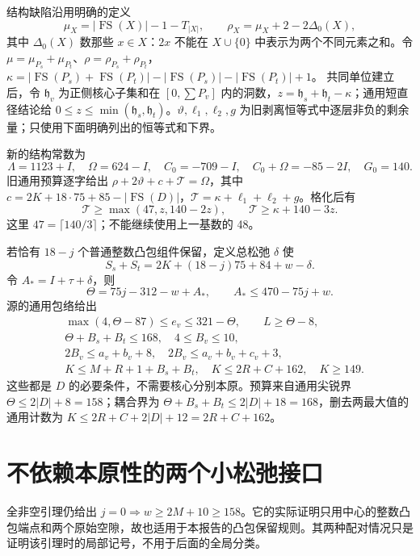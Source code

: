 \documentclass[11pt,a4paper]{article}
\begin{document}
结构缺陷沿用明确的定义 \[
\mu_X=|\operatorname{FS}(X)|-1-T_{|X|},\qquad
\rho_X=\mu_X+2-2\Delta_0(X),
\] 其中 \(\Delta_0(X)\) 数那些 \(x\in X\)：\(2x\) 不能在 \(X\cup\{0\}\)
中表示为两个不同元素之和。令
\(\mu=\mu_{P_s}+\mu_{P_t}\)、\(\rho=\rho_{P_s}+\rho_{P_t}\)，
\(\kappa=|\operatorname{FS}(P_s)+\operatorname{FS}(P_t)|-|\operatorname{FS}(P_s)|-|\operatorname{FS}(P_t)|+1\)。
共同单位建立后，令 \(\mathfrak h_v\) 为正侧核心子集和在 \([0,\sum P_v]\)
内的洞数，\(z=\mathfrak h_s+\mathfrak h_t-\kappa\)；通用短直径结论给
\(0\le z\le\min(\mathfrak h_s,\mathfrak h_t)\)。\(\vartheta,\ell_1,\ell_2,g\)
为旧剥离恒等式中逐层非负的剩余量；只使用下面明确列出的恒等式和下界。

新的结构常数为 \[
 \Lambda=1123+I,\quad \Omega=624-I,\quad C_0=-709-I,
 \quad C_0+\Omega=-85-2I,\quad G_0=140.
\] 旧通用预算逐字给出 \(\rho+2\vartheta+c+\mathcal T=\Omega\)，其中
\(c=2K+18\cdot75+85-|\operatorname{FS}(D)|\)，\(\mathcal T=\kappa+\ell_1+\ell_2+g\)。格化后有
\[
 \mathcal T\ge\max(47,z,140-2z),\qquad
 \mathcal T\ge\kappa+140-3z.
\] 这里 \(47=\lceil140/3\rceil\)；不能继续使用上一基数的 48。

若恰有 \(18-j\) 个普通整数凸包组件保留，定义总松弛 \(\delta\) 使 \[
 S_s+S_t=2K+(18-j)75+84+w-\delta.
\] 令 \(A_*=I+\tau+\delta\)，则 \[
 \Theta=75j-312-w+A_*,\qquad A_*\le470-75j+w.
\] 源的通用包络给出 \[
 \begin{aligned}
 &\max(4,\Theta-87)\le e_v\le321-\Theta,\qquad L\ge\Theta-8,\\
 &\Theta+B_s+B_t\le168,\quad 4\le B_v\le10,\\
 &2B_v\le a_v+b_v+8,\quad 2B_v\le a_v+b_v+c_v+3,\\
 &K\le M+R+1+B_s+B_t,\quad K\le2R+C+162,\quad K\ge149.
 \end{aligned}
\] 这些都是 \(D\) 的必要条件，不需要核心分别本原。预算来自通用尖锐界
\(\Theta\le2|D|+8=158\)；耦合界为
\(\Theta+B_s+B_t\le2|D|+18=168\)，删去两最大值的通用计数为
\(K\le2R+C+2|D|+12=2R+C+162\)。

\hypertarget{ux4e0dux4f9dux8d56ux672cux539fux6027ux7684ux4e24ux4e2aux5c0fux677eux5f1bux63a5ux53e3}{%
\section{不依赖本原性的两个小松弛接口}\label{ux4e0dux4f9dux8d56ux672cux539fux6027ux7684ux4e24ux4e2aux5c0fux677eux5f1bux63a5ux53e3}}

全非空引理仍给出
\(j=0\Rightarrow w\ge2M+10\ge158\)。它的实际证明只用中心的整数凸包端点和两个原始空隙，故也适用于本报告的凸包保留规则。其两种配对情况只是证明该引理时的局部记号，不用于后面的全局分类。
\end{document}
